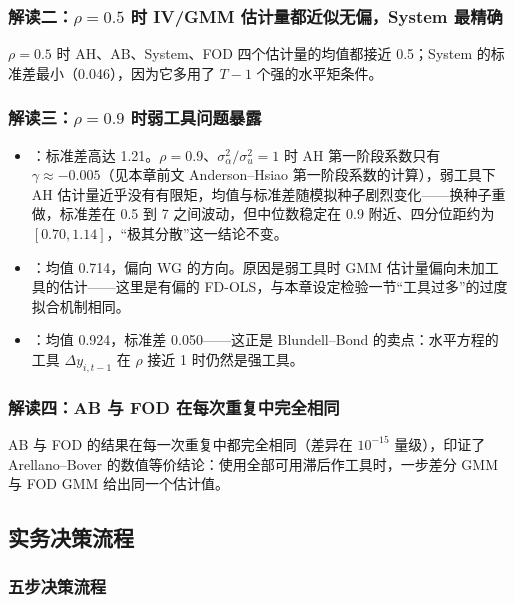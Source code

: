 \subsubsection{解读二：\texorpdfstring{$\rho=0.5$}{rho=0.5} 时 IV/GMM 估计量都近似无偏，System 最精确}

$\rho=0.5$ 时 AH、AB、System、FOD 四个估计量的均值都接近 0.5；System 的标准差最小（0.046），因为它多用了 $T-1$ 个强的水平矩条件。

\subsubsection{解读三：\texorpdfstring{$\rho=0.9$}{rho=0.9} 时弱工具问题暴露}

\begin{itemize}
  \item {}：标准差高达 1.21。$\rho=0.9$、$\sigma_\alpha^2/\sigma_u^2=1$ 时 AH 第一阶段系数只有 $\gamma\approx-0.005$（见本章前文 Anderson--Hsiao 第一阶段系数的计算），弱工具下 AH 估计量近乎没有有限矩，均值与标准差随模拟种子剧烈变化——换种子重做，标准差在 0.5 到 7 之间波动，但中位数稳定在 0.9 附近、四分位距约为 $[0.70,1.14]$，“极其分散”这一结论不变。
  \item {}：均值 0.714，偏向 WG 的方向。原因是弱工具时 GMM 估计量偏向未加工具的估计——这里是有偏的 FD-OLS，与本章设定检验一节“工具过多”的过度拟合机制相同。
  \item {}：均值 0.924，标准差 0.050——这正是 Blundell--Bond 的卖点：水平方程的工具 $\Delta y_{i,t-1}$ 在 $\rho$ 接近 1 时仍然是强工具。
\end{itemize}

\subsubsection{解读四：AB 与 FOD 在每次重复中完全相同}

AB 与 FOD 的结果在每一次重复中都完全相同（差异在 $10^{-15}$ 量级），印证了 Arellano--Bover 的数值等价结论：使用全部可用滞后作工具时，一步差分 GMM 与 FOD GMM 给出同一个估计值。

\subsection{实务决策流程}\label{sec:U12c-flow}

\subsubsection{五步决策流程}

